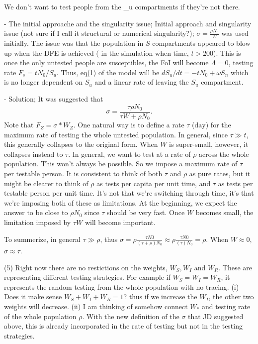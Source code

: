 We don't want to test people from the \_u compartments if they're not there.

- The initial approache and the singularity issue;
Initial approach and singularity issue (not sure if I call it structural or numerical singularity?); 
$\sigma = \frac{\rho N_0}{W}$ was used initially. The issue was that the population in $S$ compartments appeared to blow up when the DFE is achieved ( in the simulation when time, $t>200$). This is  once the only untested people are susceptibles, the FoI will become $\Lambda=0$, testing rate $F_s=t N_0/S_u$. Thus, eq(1) of the model will be $d S_u/dt = - t N_0 + \omega S_n$ which is no longer dependent on $S_u$ and a linear rate of leaving the $S_u$ compartment.

- Solution;
It was suggested that $$\sigma = \frac{\tau \rho N_0}{\tau W + \rho N_0}.$$
Note that $F_Z=\sigma * W_Z$.
One natural way is to define a rate $\tau$ ($\mathrm{day}$) for the maximum rate of testing the whole untested population. In general, since $\tau \gg t$, this generally collapses to the original form. When $W$ is super-small, however, it collapses instead to $\tau$.
In general, we want to test at a rate of $\rho$ across the whole population. This won't always be possible. So we impose a maximum rate of $\tau$ per testable person. It is consistent to think of both $\tau$ and $\rho$ as pure rates, but it might be clearer to think of $\rho$ as tests per capita per unit time, and $\tau$ as tests per testable person per unit time. It's not that we're switching through time, it's that we're imposing both of these as limitations. At the beginning, we expect the answer to be close to $\rho N_0$ since $\tau$ should be very fast. Once $W$ becomes small, the limitation imposed by $\tau W$ will become important.

To summerize, in general $\tau \gg \rho$, thus $\sigma=\rho \frac{\tau N0}{(\tau+\rho)N_0} \approx \rho \frac{\tau N0}{(\tau)N_0} = \rho$. When $W \approx 0$, $\sigma \approx \tau$.



(5) Right now there are no restictions on the weights, $W_S, W_I$ and $W_R$. These are representing different testing strategies. For example if $W_S=W_I=W_R$, it represents the random testing from the whole population with no tracing.
(i) Does it make sense $W_S+W_I+W_R=1$? thus if we increase the $W_I$, the other two weights will decrease.
(ii) I am thinking of somehow connect $W_*$ and testing rate of the whole population $\rho$. With the new definition of the $\sigma$ that JD suggested above, this is already incorporated in the rate of testing but not in the testing strategies. 

